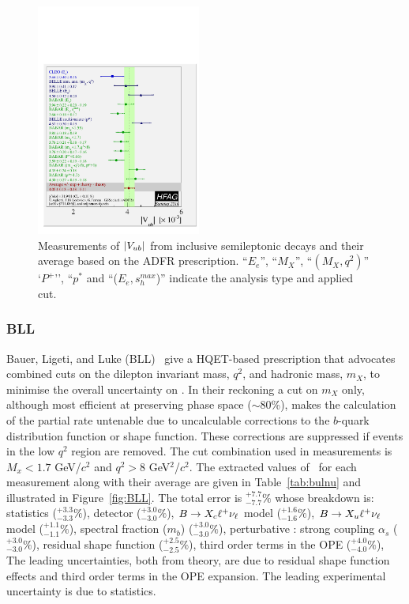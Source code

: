 \begin{figure}
\begin{center}
\includegraphics[width=0.48\textwidth]{figures/slb/vub_clnu_mc_ADFR.pdf}
\end{center}
\caption{Measurements of $|V_{ub}|$ from inclusive semileptonic decays 
and their average based on the ADFR prescription.
``$E_e$'', ``$M_X$'', ``$(M_X,q^2)$'' `$P^+$'', ``$p^*$ and ``($E_e,s^{max}_h$)'' indicate the 
analysis type and applied cut.}
\label{fig:AC}
\end{figure}



\subsubsection{BLL}
Bauer, Ligeti, and Luke (BLL)~\cite{ref:BLL} give a
HQET-based prescription that advocates combined cuts on the dilepton invariant mass, $q^2$,
and hadronic mass, $m_X$, to minimise the overall uncertainty on \vub.
In their reckoning a cut on $m_X$ only, although most efficient at
preserving phase space ($\sim$80\%), makes the calculation of the partial
rate untenable due to uncalculable corrections
to the $b$-quark distribution function or shape function. These corrections are
suppressed if events in the low $q^2$ region are removed. The cut combination used
in measurements is $M_x<1.7$ GeV/$c^2$ and $q^2 > 8$ GeV$^2$/$c^2$.  
The extracted values
of \vub\, for each measurement along with their average are given in
Table~\ref{tab:bulnu} and illustrated in Figure~\ref{fig:BLL}.
The total error is $^{+7.7}_{-7.7}\%$ whose breakdown is:
statistics ($^{+3.3}_{-3.3}\%$),
detector ($^{+3.0}_{-3.0}\%$),
$B\to X_c \ell^+ \nu_\ell$ model ($^{+1.6}_{-1.6}\%$),
$B\to X_u \ell^+ \nu_\ell$ model ($^{+1.1}_{-1.1}\%$),
spectral fraction ($m_b$) ($^{+3.0}_{-3.0}\%$),
perturbative : strong coupling $\alpha_s$ ($^{+3.0}_{-3.0}\%$),
residual shape function ($^{+2.5}_{-2.5}\%$),
third order terms in the OPE ($^{+4.0}_{-4.0}\%$),
The leading
uncertainties, both from theory, are due to residual shape function
effects and third order terms in the OPE expansion. The leading
experimental uncertainty is due to statistics. 

